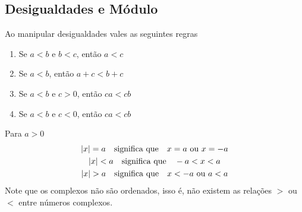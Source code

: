 \subsection*{Desigualdades e Módulo}

Ao manipular desigualdades vales as seguintes regras
\begin{enumerate}
  \item Se $a<b$ e $b<c$, então $a<c$
  \item Se $a<b$, então $a+c < b+c$
  \item Se $a<b$ e $c>0$, então $ca<cb$
  \item Se $a<b$ e $c<0$, então $ca<cb$
\end{enumerate}
Para $a>0$
\begin{gather*}
	\abs{x} = a \quad\text{significa que}\quad x=a \text{ ou } x=-a     \\
	\abs{x} < a \quad\text{significa que}\quad -a < x < a               \\
	\abs{x} > a \quad\text{significa que}\quad x < -a \text{ ou } a < a
\end{gather*}
Note que os complexos não são ordenados, isso é,
não existem as relações $>$ ou $<$ entre números complexos.

